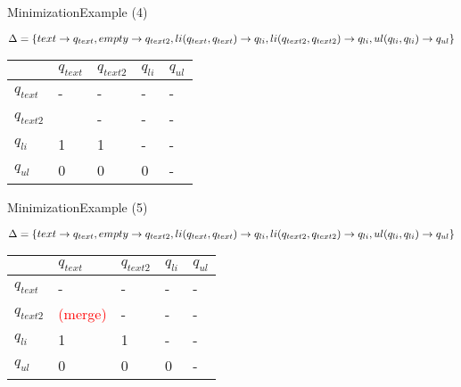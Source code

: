 \documentclass{beamer}
\begin{document}
\begin{frame}{Minimization}{Example (4)}
	\begin{example}
		\(\Delta = \{		text \rightarrow q_{text},
							\newline
							empty \rightarrow q_{text2},
							\newline
							li(q_{text}, q_{text}) \rightarrow q_{li},
							\newline
							li(q_{text2}, q_{text2}) \rightarrow q_{li},
							\newline
							ul(q_{li}, q_{li}) \rightarrow q_{ul}
		\}\)
	\end{example}
	\begin{center}
  		\begin{tabular}{| l |  l | l | l |  l  |}
    			\hline
   			 			&	 \(q_{text}\) 	& 	\(q_{text2}\) 	& 	\(q_{li}\)  	& 	\(q_{ul}\) 	\\ \hline
   			 \(q_{text}\) 	&	-			&	-			&	-		&	-		\\ \hline
   			 \(q_{text2}\) 	&				&	-			&	-		&	-		\\ \hline
			 \(q_{li}\) 		&	1			&	1			&	-		&	-		\\ \hline
			 \(q_{ul}\) 		&	0			&	0			&	0		&	-		\\
    			\hline
 		 \end{tabular}
	\end{center}
\end{frame}

\begin{frame}{Minimization}{Example (5)}
	\begin{example}
		\(\Delta = \{		text \rightarrow q_{text},
							\newline
							empty \rightarrow q_{text2},
							\newline
							li(q_{text}, q_{text}) \rightarrow q_{li},
							\newline
							li(q_{text2}, q_{text2}) \rightarrow q_{li},
							\newline
							ul(q_{li}, q_{li}) \rightarrow q_{ul}
		\}\)
	\end{example}
	\begin{center}
  		\begin{tabular}{| l |  l | l | l |  l  |}
    			\hline
   			 			&	 \(q_{text}\) 	& 	\(q_{text2}\) 	& 	\(q_{li}\)  	& 	\(q_{ul}\) 	\\ \hline
   			 \(q_{text}\) 	&	-			&	-			&	-		&	-		\\ \hline
   			 \(q_{text2}\) 	&	\textcolor{red}{(merge)}	&	-		&	-		&	-		\\ \hline
			 \(q_{li}\) 		&	1			&	1			&	-		&	-		\\ \hline
			 \(q_{ul}\) 		&	0			&	0			&	0		&	-		\\
    			\hline
 		 \end{tabular}
	\end{center}
\end{frame}
\end{document}
